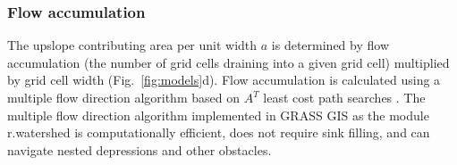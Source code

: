 \documentclass[gmd, manuscript]{copernicus}
\begin{document}



\subsubsection{Flow accumulation}
%
The upslope contributing area per unit width $a$
is determined by flow accumulation 
(the number of grid cells draining into a given grid cell)
multiplied by grid cell width (Fig.~\ref{fig:models}d). 
Flow accumulation is calculated using 
a multiple flow direction algorithm \citep{Metz2009} 
based on $A^{T}$ least cost path searches \citep{Ehlschlaeger1989}. 
The multiple flow direction algorithm 
implemented in GRASS GIS as the module r.watershed
is computationally efficient, does not require sink filling, 
and can navigate nested depressions and other obstacles. 
\end{document}
